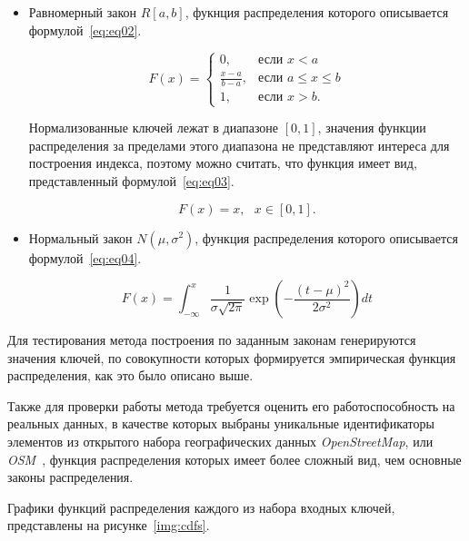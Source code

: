 \begin{itemize}
    \item Равномерный закон $R[a,b]$, фукнция распределения которого описывается
        формулой~\ref{eq:eq02}.

        \begin{equation}\label{eq:eq02}
            F(x) = \begin{cases}
                0, & \text{если } x < a \\
                \frac{x - a}{b - a}, & \text{если } a \leq x \leq b \\
                1, & \text{если } x > b.
            \end{cases}
        \end{equation}

        Нормализованные ключей лежат в диапазоне $[0, 1]$, значения функции
        распределения за пределами этого диапазона не представляют интереса для
        построения индекса, поэтому можно считать, что функция имеет вид,
        представленный формулой~\ref{eq:eq03}.

        \begin{equation}\label{eq:eq03}
            F(x) = x, \text{  } x \in [0, 1].
        \end{equation}

    \item Нормальный закон $N(\mu, \sigma^2)$, функция распределения которого
        описывается формулой~\ref{eq:eq04}.

        \begin{equation}\label{eq:eq04}
            F(x) = \int_{-\infty}^{x} \frac{1}{{\sigma \sqrt{2\pi}}}
            \exp\left(-\frac{{(t - \mu)^2}}{{2\sigma^2}}\right) dt
        \end{equation}
\end{itemize}

Для тестирования метода построения по заданным законам генерируются значения
ключей, по совокупности которых формируется эмпирическая функция распределения,
как это было описано выше.

Также для проверки работы метода требуется оценить его работоспособность на
реальных данных, в качестве которых выбраны уникальные идентификаторы элементов
из открытого набора географических данных \textit{OpenStreetMap}, или
\textit{OSM}~\cite{osm}, функция распределения которых имеет более сложный вид,
чем основные законы распределения.

Графики функций распределения каждого из набора входных ключей, представлены на
рисунке~\ref{img:cdfs}.

